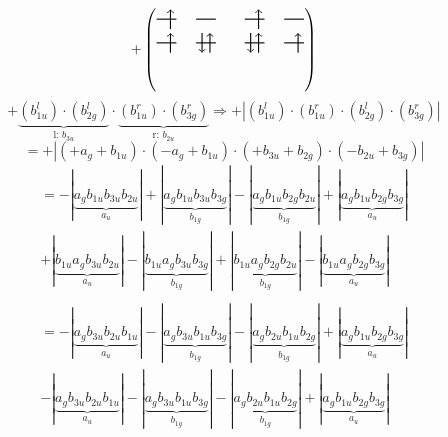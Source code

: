 \documentclass{article}
\begin{document}
\[+\left(\begin{tikzpicture}
    \draw[thick] (0,0) -- (0.5,0); %
    \draw[thick] (1,0) -- (1.5,0); %
    \draw[thick] (0,-0.6) -- (0.5,-0.6); %
    \draw[thick] (1,-0.6) -- (1.5,-0.6); %
\draw[->, thick] (0.35, -0.25) -- (0.35, 0.25); 
\draw[-> , thick] (0.35, -0.85) -- (0.35, -0.35); 
 \draw[-> , thick] (1.35, -0.85) -- (1.35, -0.35); 
\draw[<- , thick] (1.15, -0.85) -- (1.15, -0.35); 
\end{tikzpicture}\qquad \begin{tikzpicture}
    \draw[thick] (0,0) -- (0.5,0); %
    \draw[thick] (1,0) -- (1.5,0); %
    \draw[thick] (0,-0.6) -- (0.5,-0.6); %
    \draw[thick] (1,-0.6) -- (1.5,-0.6); %
\draw[->, thick] (0.35, -0.25) -- (0.35, 0.25); 
\draw[-> , thick] (0.35, -0.85) -- (0.35, -0.35); 
\draw[<- , thick] (0.15, -0.85) -- (0.15, -0.35); 
 \draw[-> , thick] (1.35, -0.85) -- (1.35, -0.35); 
\end{tikzpicture}\right)\]$$+ \underbrace{(b_{1u}^{l})\cdot (b_{2g}^{l})}_{\text{l: }b_{3u}}\cdot \underbrace{(b_{1u}^{r})\cdot (b_{3g}^{r})}_{\text{r: }b_{2u}}\Rightarrow +\left|(b_{1u}^{l}) \cdot (b_{1u}^{r}) \cdot (b_{2g}^{l}) \cdot (b_{3g}^{r})\right|$$$$=+\left|(+a_{g}+b_{1u}) \cdot (-a_{g}+b_{1u}) \cdot (+b_{3u}+b_{2g}) \cdot (-b_{2u}+b_{3g})\right|$$\begin{multline*}
=-\left|\underbrace{a_{g} b_{1u} b_{3u} b_{2u}}_{a_{u}}\right|+\left|\underbrace{a_{g} b_{1u} b_{3u} b_{3g}}_{b_{1g}}\right|-\left|\underbrace{a_{g} b_{1u} b_{2g} b_{2u}}_{b_{1g}}\right|+\left|\underbrace{a_{g} b_{1u} b_{2g} b_{3g}}_{a_{u}}\right|\\
+\left|\underbrace{b_{1u} a_{g} b_{3u} b_{2u}}_{a_{u}}\right|-\left|\underbrace{b_{1u} a_{g} b_{3u} b_{3g}}_{b_{1g}}\right|+\left|\underbrace{b_{1u} a_{g} b_{2g} b_{2u}}_{b_{1g}}\right|-\left|\underbrace{b_{1u} a_{g} b_{2g} b_{3g}}_{a_{u}}\right|\\
\end{multline*}\begin{multline*}
=-\left|\underbrace{a_{g} b_{3u} b_{2u} b_{1u}}_{a_{u}}\right|-\left|\underbrace{a_{g} b_{3u} b_{1u} b_{3g}}_{b_{1g}}\right|-\left|\underbrace{a_{g} b_{2u} b_{1u} b_{2g}}_{b_{1g}}\right|+\left|\underbrace{a_{g} b_{1u} b_{2g} b_{3g}}_{a_{u}}\right|\\
-\left|\underbrace{a_{g} b_{3u} b_{2u} b_{1u}}_{a_{u}}\right|-\left|\underbrace{a_{g} b_{3u} b_{1u} b_{3g}}_{b_{1g}}\right|-\left|\underbrace{a_{g} b_{2u} b_{1u} b_{2g}}_{b_{1g}}\right|+\left|\underbrace{a_{g} b_{1u} b_{2g} b_{3g}}_{a_{u}}\right|\\

\end{multline*}
\end{document}
